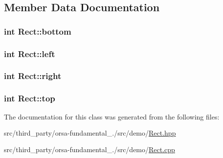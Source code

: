 \subsection{Member Data Documentation}
\hypertarget{classRect_a34f470ffa9b5f83ad3be7764ebd403b4}{}
\subsubsection[{bottom}]{\setlength{\rightskip}{0pt plus 5cm}int Rect\+::bottom}\label{classRect_a34f470ffa9b5f83ad3be7764ebd403b4}
\hypertarget{classRect_ab0841a51d249d8560ddca36054fd1e57}{}
\subsubsection[{left}]{\setlength{\rightskip}{0pt plus 5cm}int Rect\+::left}\label{classRect_ab0841a51d249d8560ddca36054fd1e57}
\hypertarget{classRect_aedfb34dad0634ee71105ddfd2c885243}{}
\subsubsection[{right}]{\setlength{\rightskip}{0pt plus 5cm}int Rect\+::right}\label{classRect_aedfb34dad0634ee71105ddfd2c885243}
\hypertarget{classRect_abb300f9f75fcb27d2a27ae5e260d2ed2}{}
\subsubsection[{top}]{\setlength{\rightskip}{0pt plus 5cm}int Rect\+::top}\label{classRect_abb300f9f75fcb27d2a27ae5e260d2ed2}


The documentation for this class was generated from the following files\+:\begin{DoxyCompactItemize}
\item 
src/third\+\_\+party/orsa-\/fundamental\+\_./src/demo/\hyperlink{Rect_8hpp}{Rect.\+hpp}\item 
src/third\+\_\+party/orsa-\/fundamental\+\_./src/demo/\hyperlink{Rect_8cpp}{Rect.\+cpp}\end{DoxyCompactItemize}
